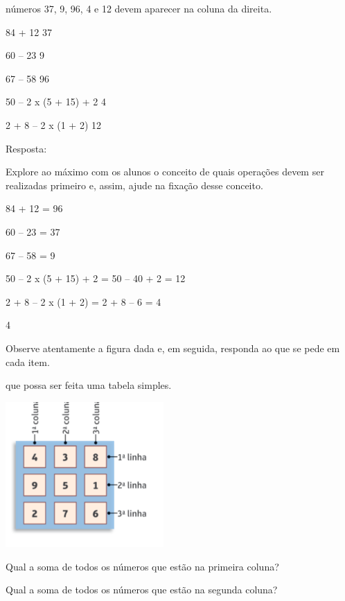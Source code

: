 \begin{escolha}
\Os números 37, 9, 96, 4 e 12 devem aparecer na coluna da direita.

84 + 12                   37

60 -- 23                   9

67 -- 58                    96

50 -- 2 x (5 + 15) + 2      4

2 + 8 -- 2 x (1 + 2)           12



Resposta:

Explore ao máximo com os alunos o conceito de quais operações
devem ser realizadas primeiro e, assim, ajude na fixação desse conceito.

84 + 12 = 96

60 -- 23 = 37

67 -- 58 = 9

50 -- 2 x (5 + 15) + 2 = 50 -- 40 + 2 = 12

2 + 8 -- 2 x (1 + 2) = 2 + 8 -- 6 = 4

\num{4}

Observe atentamente a figura dada e, em seguida, responda ao que se pede em cada item.

\Imagino que possa ser feita uma tabela simples.

\includegraphics[width=2.37521in,height=2.18352in]{media/image21.png}

\begin{escolha}

\item
  Qual a soma de todos os números que estão na primeira coluna?

\item
  Qual a soma de todos os números que estão na segunda coluna?


\end{escolha}
\end{escolha}
